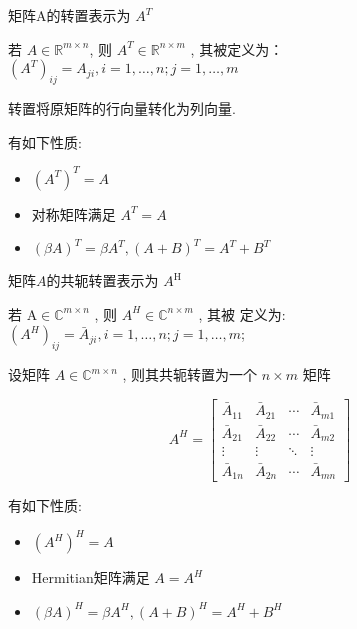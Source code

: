 \begin{definition}[Transpose]
    矩阵A的转置表示为 $ A^{T} $
    
    若 $A\in \mathbb{R}^{m \times n} $, 则 $ A^{T} \in \mathbb{R}^{n \times m} $ , 其被定义为： $ \left(A^{T}\right)_{i j}=A_{j i}, i=1, \ldots, n ; j=1, \ldots, m $
\end{definition}

转置将原矩阵的行向量转化为列向量.

\begin{corollary}
    [转置的性质]
    有如下性质:
    \begin{itemize}
        \item $ \left(A^{T}\right)^{T}=A $
        \item 对称矩阵满足 $ A^{T}=A $
        \item $ (\beta A)^{T}=\beta A^{T},(A+B)^{T}=A^{T}+B^{T} $
    \end{itemize}
\end{corollary}

\begin{definition}[共轭转置]
    矩阵$A$的共轭转置表示为 $ A^{\mathrm{H}} $
    
    若 $ \mathrm{A} \in \mathbb{C}^{m \times n} $ , 则 $ A^{H} \in \mathbb{C}^{n \times m} $ , 其被 定义为: $ \left(A^{H}\right)_{i j}=\bar{A}_{j i}, i=1, \ldots, n ; j=1, \ldots, m $;

    设矩阵 $ A \in \mathbb{C}^{m \times n} $ , 则其共轭转置为一个 $ n \times m $ 矩阵

$$
A^{H}=\left[\begin{array}{cccc}
\bar{A}_{11} & \bar{A}_{21} & \cdots & \bar{A}_{m 1} \\
\bar{A}_{21} & \bar{A}_{22} & \cdots & \bar{A}_{m 2} \\
\vdots & \vdots & \ddots & \vdots \\
\bar{A}_{1 n} & \bar{A}_{2 n} & \cdots & \bar{A}_{m n}
\end{array}\right]
$$
\end{definition}

\begin{corollary}[共轭转置的性质]
    有如下性质:
    \begin{itemize}
        \item $ \left(A^{H}\right)^{H}=A $
        \item Hermitian矩阵满足 $ A=A^{H} $
        \item $ (\beta A)^{H}=\beta A^{H},(A+B)^{H}=A^{H}+B^{H} $
    \end{itemize}
\end{corollary}


